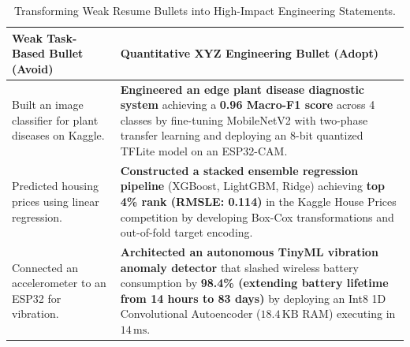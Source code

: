 \begin{table}[htbp]
\centering
\small
\caption{Transforming Weak Resume Bullets into High-Impact Engineering Statements.}\label{tab:xyz_formula}
\begin{tabular}{@{}p{6.5cm}p{8.5cm}@{}}
\toprule
\textbf{Weak Task-Based Bullet (Avoid)} & \textbf{Quantitative XYZ Engineering Bullet (Adopt)} \\ \midrule
Built an image classifier for plant diseases on Kaggle. & 
\textbf{Engineered an edge plant disease diagnostic system} achieving a \textbf{0.96 Macro-F1 score} across 4 classes by fine-tuning MobileNetV2 with two-phase transfer learning and deploying an 8-bit quantized TFLite model on an ESP32-CAM. \\ \addlinespace

Predicted housing prices using linear regression. & 
\textbf{Constructed a stacked ensemble regression pipeline} (XGBoost, LightGBM, Ridge) achieving \textbf{top 4\% rank (RMSLE: 0.114)} in the Kaggle House Prices competition by developing Box-Cox transformations and out-of-fold target encoding. \\ \addlinespace

Connected an accelerometer to an ESP32 for vibration. & 
\textbf{Architected an autonomous TinyML vibration anomaly detector} that slashed wireless battery consumption by \textbf{98.4\% (extending battery lifetime from 14 hours to 83 days)} by deploying an Int8 1D Convolutional Autoencoder ($18.4\,\text{KB}$ RAM) executing in $14\,\text{ms}$. \\ \bottomrule
\end{tabular}
\end{table}

